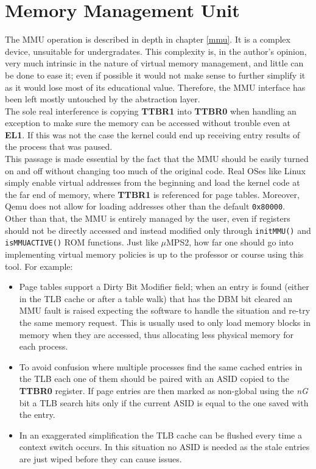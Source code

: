 \documentclass[12pt,a4paper,openright,twoside]{report}
\begin{document}
\section{Memory Management Unit}
The MMU operation is described in depth in chapter \ref{mmu}. It is a complex 
device, unsuitable for undergradates. This complexity is, in the author's opinion,
very much intrinsic in the nature of virtual memory management, and little can
be done to ease it; even if possible it would not make sense to further simplify it as 
it would lose most of its educational value.
Therefore, the MMU interface has been left mostly untouched by the abstraction layer.\\
The sole real interference is copying \textbf{TTBR1} into \textbf{TTBR0} when 
handling an exception to make sure the memory can be accessed without trouble 
even at \textbf{EL1}. If this was not the case the kernel could end up receiving 
entry results of the process that was paused.\\
This passage is made essential by the fact that the MMU should be easily turned
on and off without changing too much of the original code. Real OSes like
Linux simply enable virtual addresses from the beginning and load the kernel
code at the far end of memory, where \textbf{TTBR1} is referenced for page tables.
Moreover, Qemu does not allow for loading addresses other than the default 
{\tt 0x80000}. \\

Other than that, the MMU is entirely managed by the user, even if
registers should not be directly accessed and instead modified only through 
{\tt initMMU()} and {\tt isMMUACTIVE()} ROM functions.
Just like $\mu$MPS2, how far one should go into implementing virtual 
memory policies is up to the professor or course using this tool. For
example:
\begin{itemize}
    \item Page tables support a Dirty Bit Modifier field; when an entry is found
        (either in the TLB cache or after a table walk) that has the DBM bit 
        cleared an MMU fault is raised expecting the software to handle the
        situation and re-try the same memory request. This is usually used 
        to only load memory blocks in memory when they are accessed, thus
        allocating less physical memory for each process.
    \item To avoid confusion where multiple processes find the same cached entries
        in the TLB each one of them should be paired with an ASID copied to the
        \textbf{TTBR0} register. If page entries are then marked as non-global
        using the \textit{nG} bit a TLB search hits only if the current ASID is equal
        to the one saved with the entry.
    \item In an exaggerated simplification the TLB cache can be flushed every time
        a context switch occurs. In this situation no ASID is needed as the stale
        entries are just wiped before they can cause issues.
\end{itemize}
\end{document}

